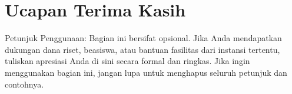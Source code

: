 \chapter*{Ucapan Terima Kasih}


Petunjuk Penggunaan: Bagian ini bersifat opsional. Jika Anda mendapatkan dukungan dana riset, beasiswa, atau bantuan fasilitas dari instansi tertentu, tuliskan apresiasi Anda di sini secara formal dan ringkas. Jika ingin menggunakan bagian ini, jangan lupa untuk menghapus seluruh petunjuk dan contohnya.
